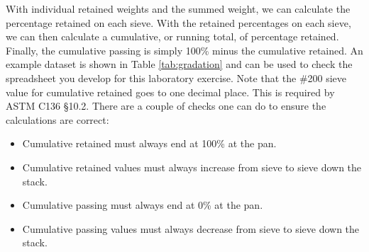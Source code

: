 \documentclass[12pt]{article}
\begin{document}
With individual retained weights and the summed weight, we can calculate the percentage retained on each sieve. With the retained percentages on each sieve, we can then calculate a cumulative, or running total, of percentage retained. Finally, the cumulative passing is simply 100\% minus the cumulative retained. An example dataset is shown in Table \ref{tab:gradation} and can be used to check the spreadsheet you develop for this laboratory exercise. Note that the \#200 sieve value for cumulative retained goes to one decimal place. This is required by ASTM C136 \S10.2. There are a couple of checks one can do to ensure the calculations are correct:
\begin{itemize}
    \item Cumulative retained must always end at 100\% at the pan.
    \item Cumulative retained values must always increase from sieve to sieve down the stack.
    \item Cumulative passing must always end at 0\% at the pan.
    \item Cumulative passing values must always decrease from sieve to sieve down the stack.
\end{itemize}
\end{document}

